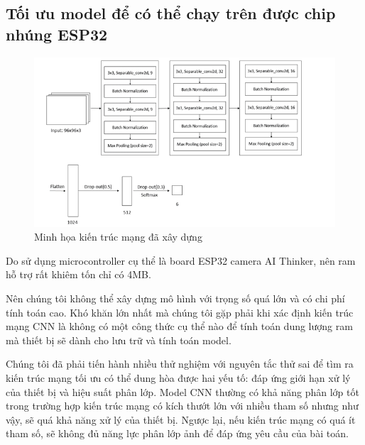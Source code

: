 \subsection{Tối ưu model để có thể chạy trên được chip nhúng ESP32}
\begin{figure}[ht]
    \centering
    \includegraphics[width=\linewidth]{images/Quanh/ktmang.png}
    \caption{ Minh họa kiến trúc mạng đã xây dựng}
    \label{fig:kientrucmang}
\end{figure}

Do sử dụng microcontroller cụ thể là board ESP32 camera AI Thinker, nên ram hỗ trợ rất khiêm tốn chỉ có 4MB. 

Nên chúng tôi không thể xây dựng mô hình với trọng số quá lớn và có chi phí tính toán cao. Khó khăn lớn nhất mà chúng tôi gặp phải khi xác định kiến trúc mạng CNN là không có một công thức cụ thể nào để tính toán dung lượng ram mà thiết bị sẽ dành cho lưu trữ và tính toán model.

Chúng tôi đã phải tiến hành nhiều thử nghiệm với nguyên tắc thử sai để tìm ra kiến trúc mạng tối ưu có thể dung hòa được hai yếu tố: đáp ứng giới hạn xử lý của thiết bị và hiệu suất phân lớp. Model CNN thường có khả năng phân lớp tốt trong trường hợp kiến trúc mạng có kích thướt lớn với nhiều tham số nhưng như vậy, sẽ quá khả năng xử lý của thiết bị. Ngược lại, nếu kiến trúc mạng có quá ít tham số, sẽ không đủ năng lực phân lớp ảnh để đáp ứng yêu cầu của bài toán.



